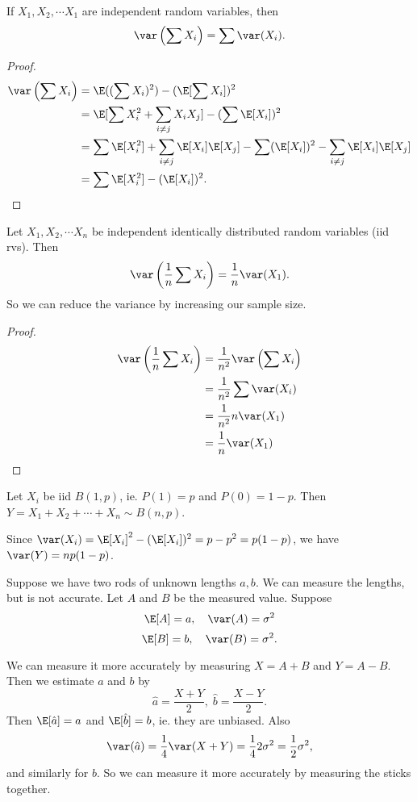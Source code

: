 \documentclass[a4paper]{article}
\begin{document}
\begin{thm}
  If $X_1, X_2, \cdots X_1$ are independent random variables, then
  \[
    \var\left(\sum X_i\right) = \sum \var (X_i).
  \]
\end{thm}

\begin{proof}
  \begin{align*}
    \var\left(\sum X_i\right) &= \E((\sum X_i)^2) - (\E[\sum X_i])^2\\
    &= \E[\sum X_i^2 + \sum_{i \not =j} X_iX_j] - (\sum\E [X_i])^2\\
    &= \sum \E[X_i^2] + \sum_{i\not= j}\E[X_i]\E[X_j] - \sum(\E[X_i])^2 - \sum_{i\not= j}\E[X_i]\E[X_j]\\
    &= \sum \E[X_i^2] - (\E[X_i])^2.
  \end{align*}
\end{proof}

\begin{cor}
 Let $X_1, X_2, \cdots X_n$ be independent identically distributed random variables (iid rvs). Then
 \[
   \var\left(\frac{1}{n}\sum X_i\right) = \frac{1}{n}\var (X_1).
 \]
 So we can reduce the variance by increasing our sample size.
\end{cor}

\begin{proof}
  \begin{align*}
    \var\left(\frac{1}{n}\sum X_i\right) &= \frac{1}{n^2}\var\left(\sum X_i\right)\\
    &= \frac{1}{n^2}\sum \var(X_i)\\
    &= \frac{1}{n^2} n \var(X_1)\\
    &= \frac{1}{n}\var (X_1)
  \end{align*}
\end{proof}

\begin{eg}
  Let $X_i$ be iid $B(1, p)$, ie. $P(1) = p$ and $P(0) = 1 - p$. Then $Y = X_1 + X_2 + \cdots + X_n \sim B(n, p)$. 
  
  Since $\var(X_i) = \E[X_i]^2 - (\E[X_i])^2 = p - p^2 = p(1 - p)$, we have $\var (Y) = np(1 - p)$.
\end{eg}

\begin{eg}
  Suppose we have two rods of unknown lengths $a, b$. We can measure the lengths, but is not accurate. Let $A$ and $B$ be the measured value. Suppose
  \[
    \E[A] = a,\quad \var(A) = \sigma^2
  \]
  \[
    \E[B] = b, \quad \var(B) = \sigma^2.
  \]

  We can measure it more accurately by measuring $X = A + B$ and $Y = A - B$. Then we estimate $a$ and $b$ by
  \[
    \hat{a} = \frac{X + Y}{2},\; \hat{b} = \frac{X - Y}{2}.
  \]
  Then $\E[\hat{a}] = a$ and $\E[\hat{b}] = b$, ie. they are unbiased. Also
  \[
    \var (\hat{a}) = \frac{1}{4}\var(X + Y) = \frac{1}{4}2\sigma^2 = \frac{1}{2}\sigma^2,
  \]
  and similarly for $b$. So we can measure it more accurately by measuring the sticks together.
\end{eg}
\end{document}
